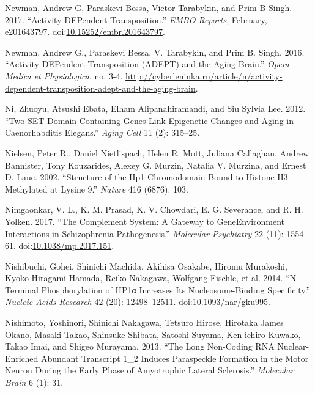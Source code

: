 \documentclass[onehalf,12pt]{beavtex}
\begin{document}
  \hypertarget{ref-NewmanActivityDEPendentTransposition2017}{}
  Newman, Andrew G, Paraskevi Bessa, Victor Tarabykin, and Prim B Singh.
  2017. ``Activity‐DEPendent Transposition.'' \emph{EMBO Reports},
  February, e201643797.
  doi:\href{https://doi.org/10.15252/embr.201643797}{10.15252/embr.201643797}.
  
  \hypertarget{ref-NewmanActivityDEPendentTransposition2016}{}
  Newman, Andrew G., Paraskevi Bessa, V. Tarabykin, and Prim B. Singh.
  2016. ``Activity DEPendent Transposition (ADEPT) and the Aging Brain.''
  \emph{Opera Medica et Physiologica}, no. 3-4.
  \url{http://cyberleninka.ru/article/n/activity-dependent-transposition-adept-and-the-aging-brain}.
  
  \hypertarget{ref-NiTwoSETdomain2012}{}
  Ni, Zhuoyu, Atsushi Ebata, Elham Alipanahiramandi, and Siu Sylvia Lee.
  2012. ``Two SET Domain Containing Genes Link Epigenetic Changes and
  Aging in Caenorhabditis Elegans.'' \emph{Aging Cell} 11 (2): 315--25.
  
  \hypertarget{ref-NielsenStructureHP1chromodomain2002}{}
  Nielsen, Peter R., Daniel Nietlispach, Helen R. Mott, Juliana Callaghan,
  Andrew Bannister, Tony Kouzarides, Alexey G. Murzin, Natalia V. Murzina,
  and Ernest D. Laue. 2002. ``Structure of the Hp1 Chromodomain Bound to
  Histone H3 Methylated at Lysine 9.'' \emph{Nature} 416 (6876): 103.
  
  \hypertarget{ref-Nimgaonkarcomplementsystemgateway2017}{}
  Nimgaonkar, V. L., K. M. Prasad, K. V. Chowdari, E. G. Severance, and R.
  H. Yolken. 2017. ``The Complement System: A Gateway to GeneEnvironment
  Interactions in Schizophrenia Pathogenesis.'' \emph{Molecular
  Psychiatry} 22 (11): 1554--61.
  doi:\href{https://doi.org/10.1038/mp.2017.151}{10.1038/mp.2017.151}.
  
  \hypertarget{ref-NishibuchiNterminalphosphorylationHP1a2014}{}
  Nishibuchi, Gohei, Shinichi Machida, Akihisa Osakabe, Hiromu Murakoshi,
  Kyoko Hiragami-Hamada, Reiko Nakagawa, Wolfgang Fischle, et al. 2014.
  ``N-Terminal Phosphorylation of HP1α Increases Its Nucleosome-Binding
  Specificity.'' \emph{Nucleic Acids Research} 42 (20): 12498--12511.
  doi:\href{https://doi.org/10.1093/nar/gku995}{10.1093/nar/gku995}.
  
  \hypertarget{ref-NishimotolongnoncodingRNA2013}{}
  Nishimoto, Yoshinori, Shinichi Nakagawa, Tetsuro Hirose, Hirotaka James
  Okano, Masaki Takao, Shinsuke Shibata, Satoshi Suyama, Ken-ichiro
  Kuwako, Takao Imai, and Shigeo Murayama. 2013. ``The Long Non-Coding RNA
  Nuclear-Enriched Abundant Transcript 1\_2 Induces Paraspeckle Formation
  in the Motor Neuron During the Early Phase of Amyotrophic Lateral
  Sclerosis.'' \emph{Molecular Brain} 6 (1): 31.
  
\end{document}
